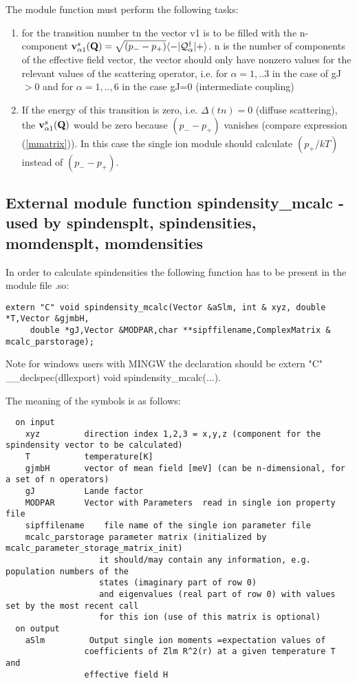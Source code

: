 The module function must perform the following tasks:
\begin{enumerate}
\item for the transition number tn the vector v1  is to be filled with the n-component 
 ${\mathbf v^s_{\alpha1}}(\mathbf Q)=\sqrt{(p_--p_+)}\langle -|\mathcal Q^{\dag}_{\alpha}|+\rangle$.
n is the number of components of the effective field vector, the vector
should only have nonzero values for the relevant values of
the scattering operator, i.e. for $\alpha=1,..3$ in the case of
gJ$>$0 and for $\alpha=1,..,6$ in the case gJ=0 (intermediate coupling)
\item
If the energy of this transition
is zero, i.e. $\Delta(tn)=0$ (diffuse scattering), 
the ${\mathbf v^s_{\alpha1}}(\mathbf Q)$ 
 would be zero because $(p_--p_+)$ vanishes (compare expression (\ref{mmatrix})).
In this case the single ion module should calculate $(p_+/kT)$ instead of $(p_--p_+)$.
\end{enumerate}

\subsection{External module function {\prg spindensity\_mcalc} -
used by {\prg spindensplt},
{\prg spindensities},
{\prg momdensplt},
{\prg momdensities}}

In order to calculate spindensities
the following function has to be
present in the module file {\prg *.so}:

\begin{verbatim}
extern "C" void spindensity_mcalc(Vector &aSlm, int & xyz, double *T,Vector &gjmbH,
     double *gJ,Vector &MODPAR,char **sipffilename,ComplexMatrix & mcalc_parstorage);
\end{verbatim}

Note for windows users with MINGW the declaration should be {\prg extern "C" \_\_declspec(dllexport) void %
spindensity\_mcalc(...)}.

The meaning of the symbols is as follows:
{\footnotesize
\begin{verbatim}
  on input
    xyz         direction index 1,2,3 = x,y,z (component for the spindensity vector to be calculated)
    T           temperature[K]
    gjmbH       vector of mean field [meV] (can be n-dimensional, for a set of n operators)
    gJ          Lande factor
    MODPAR      Vector with Parameters  read in single ion property file
    sipffilename    file name of the single ion parameter file
    mcalc_parstorage parameter matrix (initialized by mcalc_parameter_storage_matrix_init)
                   it should/may contain any information, e.g. population numbers of the
				   states (imaginary part of row 0)
                   and eigenvalues (real part of row 0) with values set by the most recent call
                   for this ion (use of this matrix is optional)
  on output
    aSlm         Output single ion moments =expectation values of
                coefficients of Zlm R^2(r) at a given temperature T and
                effective field H
\end{verbatim}
}

